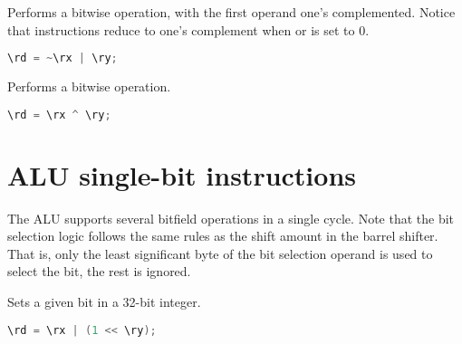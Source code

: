 Performs a bitwise  operation, with the first operand one's
complemented. Notice that  instructions reduce to one's complement
when  or  is set to 0.

\begin{lstlisting}[numbers=none, basicstyle=\ttfamily\footnotesize, language=C++]
\rd = ~\rx | \ry;
\end{lstlisting}

Performs a bitwise  operation.

\begin{lstlisting}[numbers=none, basicstyle=\ttfamily\footnotesize, language=C++]
\rd = \rx ^ \ry;
\end{lstlisting}

\section{ALU single-bit instructions}


The \rvex{} ALU supports several bitfield operations in a single cycle. Note
that the bit selection logic follows the same rules as the shift amount in the
barrel shifter. That is, only the least significant byte of the bit selection
operand is used to select the bit, the rest is ignored.

Sets a given bit in a 32-bit integer.

\begin{lstlisting}[numbers=none, basicstyle=\ttfamily\footnotesize, language=C++]
\rd = \rx | (1 << \ry);
\end{lstlisting}

